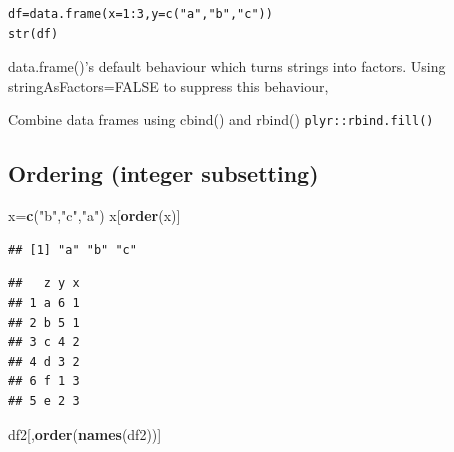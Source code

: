 \documentclass[
]{book}
\newenvironment{Shaded}{\begin{snugshade}}{\end{snugshade}}
\newcommand{\DataTypeTok}[1]{\textcolor[rgb]{0.13,0.29,0.53}{#1}}
\newcommand{\DecValTok}[1]{\textcolor[rgb]{0.00,0.00,0.81}{#1}}
\newcommand{\KeywordTok}[1]{\textcolor[rgb]{0.13,0.29,0.53}{\textbf{#1}}}
\newcommand{\NormalTok}[1]{#1}
\newcommand{\OperatorTok}[1]{\textcolor[rgb]{0.81,0.36,0.00}{\textbf{#1}}}
\newcommand{\StringTok}[1]{\textcolor[rgb]{0.31,0.60,0.02}{#1}}
\theoremstyle{definition}
\theoremstyle{definition}
\theoremstyle{definition}
\theoremstyle{remark}
\begin{document}
\begin{verbatim}
df=data.frame(x=1:3,y=c("a","b","c"))
str(df)
\end{verbatim}

data.frame()'s default behaviour which turns strings into factors. Using stringAsFactors=FALSE to suppress this behaviour,

Combine data frames using cbind() and rbind()
\texttt{plyr::rbind.fill()}

\hypertarget{ordering-integer-subsetting}{%
\subsection{Ordering (integer subsetting)}\label{ordering-integer-subsetting}}

\begin{Shaded}
\begin{Highlighting}[]
\NormalTok{x=}\KeywordTok{c}\NormalTok{(}\StringTok{"b"}\NormalTok{,}\StringTok{"c"}\NormalTok{,}\StringTok{"a"}\NormalTok{)}
\NormalTok{x[}\KeywordTok{order}\NormalTok{(x)]}
\end{Highlighting}
\end{Shaded}

\begin{verbatim}
## [1] "a" "b" "c"
\end{verbatim}

\begin{Shaded}
\end{Shaded}

\begin{verbatim}
##   z y x
## 1 a 6 1
## 2 b 5 1
## 3 c 4 2
## 4 d 3 2
## 6 f 1 3
## 5 e 2 3
\end{verbatim}

\begin{Shaded}
\begin{Highlighting}[]
\NormalTok{df2[,}\KeywordTok{order}\NormalTok{(}\KeywordTok{names}\NormalTok{(df2))]}
\end{Highlighting}
\end{Shaded}
\end{document}
